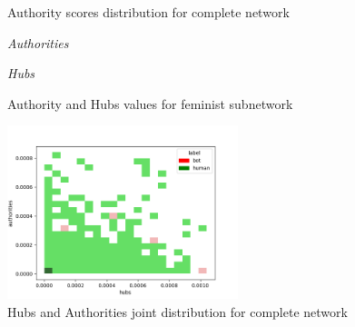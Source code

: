 \documentclass[12pt, a4paper]{article}
\begin{document}
\begin{itemize}
\begin{figure}[H]
                    \caption{Authority scores distribution for complete network}
                \end{figure}
                \begin{figure}[H]
    				\centering
    				\begin{minipage}[b]{0.49\textwidth}    				
        				\centering
        				\setlength{\fboxsep}{0pt}
    					\setlength{\fboxrule}{0.5pt}
        				\textit{\small Authorities}
    				\end{minipage}
    				\hfill
    				\begin{minipage}[b]{0.49\textwidth}
        				\centering
        				\setlength{\fboxsep}{0pt}
    					\setlength{\fboxrule}{0.5pt}
        				\textit{\small Hubs}
    				\end{minipage}
    				\caption{Authority and Hubs values for feminist subnetwork}
				\end{figure}
                \begin{figure}[H]
                    \centering
                    \includegraphics[width=0.6\textwidth]{complete_hubs&authorities_joint_distribution.png}
                    \caption{Hubs and Authorities joint distribution for complete network}
                    \label{fig:joint_distribution}
                \end{figure}
		\end{itemize}
\end{document}
